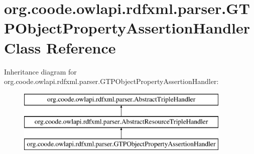 \hypertarget{classorg_1_1coode_1_1owlapi_1_1rdfxml_1_1parser_1_1_g_t_p_object_property_assertion_handler}{\section{org.\-coode.\-owlapi.\-rdfxml.\-parser.\-G\-T\-P\-Object\-Property\-Assertion\-Handler Class Reference}
\label{classorg_1_1coode_1_1owlapi_1_1rdfxml_1_1parser_1_1_g_t_p_object_property_assertion_handler}
}
Inheritance diagram for org.\-coode.\-owlapi.\-rdfxml.\-parser.\-G\-T\-P\-Object\-Property\-Assertion\-Handler\-:\begin{figure}[H]
\begin{center}
\leavevmode
\includegraphics[height=3.000000cm]{classorg_1_1coode_1_1owlapi_1_1rdfxml_1_1parser_1_1_g_t_p_object_property_assertion_handler}
\end{center}
\end{figure}
